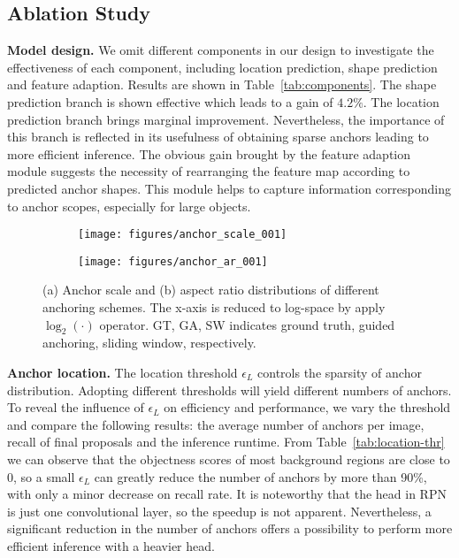 \documentclass[10pt,twocolumn,letterpaper]{article}
\begin{document}
\subsection{Ablation Study}

\noindent
\textbf{Model design.}
We omit different components in our design to investigate the effectiveness
of each component, including location prediction, shape prediction and
feature adaption.
Results are shown in Table~\ref{tab:components}. The shape prediction branch
is shown effective which leads to a gain of $4.2\%$.
The location prediction branch brings marginal improvement. Nevertheless, the importance of this branch is reflected in its usefulness of obtaining sparse anchors leading to more efficient inference.
The obvious gain brought by the feature adaption module suggests the necessity
of rearranging the feature map according to predicted anchor shapes.
This module helps to capture information corresponding to anchor scopes,
especially for large objects.

\begin{figure}[tb]
	\centering
	\begin{subfigure}{.23\textwidth}
		\centering
		\texttt{[image: figures/anchor\_scale\_001]}
		\caption{}
		\label{subfig:anchor-scale}
	\end{subfigure}
	\vspace{-0.2cm}
	\begin{subfigure}{.23\textwidth}
		\centering
		\texttt{[image: figures/anchor\_ar\_001]}
		\caption{}
		\label{subfig:anchor-ar}
	\end{subfigure}
	\vspace{-0.2cm}
	\caption{\small{(a) Anchor scale and (b) aspect ratio distributions of different anchoring schemes.
		The x-axis is reduced to log-space by apply $\log_2(\cdot)$ operator. GT, GA, SW indicates ground truth, guided anchoring, sliding window, respectively.}}
	\label{fig:anchor-dist}
	\vspace{-0.6cm}
\end{figure}

\noindent
\textbf{Anchor location.}
The location threshold $\epsilon_L$ controls the sparsity of anchor distribution.
Adopting different thresholds will yield different numbers of anchors.
To reveal the influence of $\epsilon_L$ on efficiency and performance,
we vary the threshold and compare the following results: the average number
of anchors per image, recall of final proposals and the inference runtime.
From Table~\ref{tab:location-thr} we can observe that the objectness scores of
most background regions are close to 0, so a small $\epsilon_L$ can
greatly reduce the number of anchors by more than 90\%, with only a minor
decrease on recall rate.
It is noteworthy that the head in RPN is just one convolutional layer,
so the speedup is not apparent. Nevertheless, a significant reduction in the number of anchors offers a possibility to perform more efficient inference with a heavier head.
\end{document}
